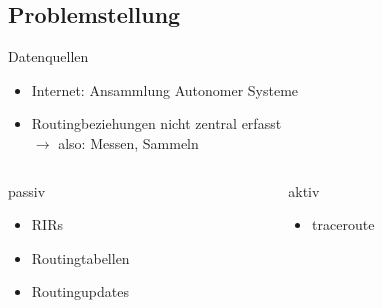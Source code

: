 \documentclass[ngerman,compress,hyperref={bookmarks}]{beamer}
\begin{document}
\subsection{Problemstellung}
\begin{frame}{Datenquellen}
  \begin{itemize}
    \item Internet: Ansammlung Autonomer Systeme
    \item Routingbeziehungen nicht zentral erfasst\\$\rightarrow$ also: Messen, Sammeln
  \end{itemize}

  \begin{columns}[t]
    \begin{column}{0.4\textwidth}
      passiv
      \begin{itemize}
        \item RIRs
        \item Routingtabellen
        \item Routingupdates
      \end{itemize}
    \end{column}
    \begin{column}{0.4\textwidth}
      aktiv
      \begin{itemize}
        \item traceroute
      \end{itemize}
    \end{column}
  \end{columns}
\end{frame}
\end{document}
